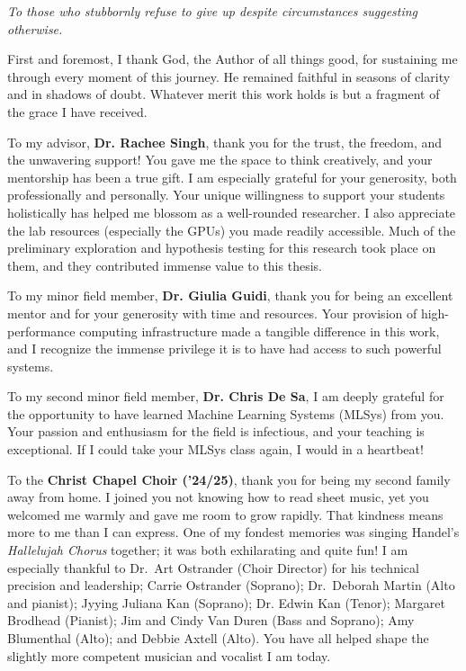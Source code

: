 \begin{dedication}
    \textit{To those who stubbornly refuse to give up despite circumstances suggesting otherwise.}
\end{dedication}

\begin{acknowledgements}
    First and foremost, I thank God, the Author of all things good,
    for sustaining me through every moment of this journey.
    He remained faithful in seasons of clarity and in shadows of doubt.
    Whatever merit this work holds is but a fragment of the grace I have received.

    To my advisor, \textbf{Dr. Rachee Singh}, thank you for the trust, the freedom, and the unwavering support!
    You gave me the space to think creatively, and your mentorship has been a true gift.
    I am especially grateful for your generosity, both professionally and personally.
    Your unique willingness to support your students holistically has
    helped me blossom as a well-rounded researcher.
    I also appreciate the lab resources (especially the GPUs) you made readily accessible.
    Much of the preliminary exploration and hypothesis testing for this research took place on them,
    and they contributed immense value to this thesis.

    To my minor field member, \textbf{Dr. Giulia Guidi}, thank you for being an excellent mentor
    and for your generosity with time and resources.
    Your provision of high-performance computing infrastructure made a tangible difference in this work,
    and I recognize the immense privilege it is to have had access to such powerful systems.

    To my second minor field member, \textbf{Dr. Chris De Sa}, I am deeply grateful for the opportunity to
    have learned Machine Learning Systems (MLSys) from you.
    Your passion and enthusiasm for the field is infectious, and your teaching is exceptional.
    If I could take your MLSys class again, I would in a heartbeat!

    To the \textbf{Christ Chapel Choir (’24/25)}, thank you for being my second family away from home.
    I joined you not knowing how to read sheet music, yet you welcomed me warmly and gave me room to grow rapidly.
    That kindness means more to me than I can express.
    One of my fondest memories was singing Handel’s \textit{Hallelujah Chorus} together; it was both exhilarating
    and quite fun!
    I am especially thankful to Dr.\ Art Ostrander (Choir Director) for his technical precision and leadership;
    Carrie Ostrander (Soprano);
    Dr.\ Deborah Martin (Alto and pianist);
    Jyying Juliana Kan (Soprano); Dr. Edwin Kan (Tenor);
    Margaret Brodhead (Pianist); Jim and Cindy Van Duren (Bass and Soprano);
    Amy Blumenthal (Alto); and Debbie Axtell (Alto).
    You have all helped shape the slightly more competent musician and vocalist I am today.


\end{acknowledgements}

